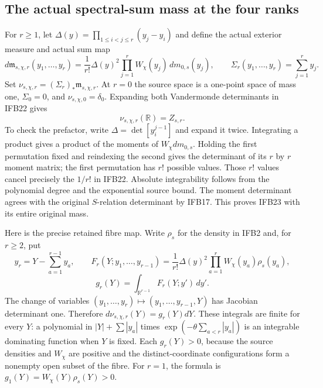 \documentclass[11pt,a4paper]{article}
\begin{document}
\subsection{The actual spectral-sum mass at the four ranks}

For $r\geq1$, let $\Delta(y)=\prod_{1\leq i<j\leq r}(y_j-y_i)$
and define the actual exterior measure and actual sum map
\[
 d\mathfrak m_{s,\chi,r}(y_1,\ldots,y_r)
 =\frac1{r!}\Delta(y)^2\prod_{j=1}^r
       W_\chi(y_j)\,dm_{0,s}(y_j),\qquad
 \Sigma_r(y_1,\ldots,y_r)=\sum_{j=1}^ry_j.
 \tag{IFB22}
\]
Set $\nu_{s,\chi,r}=(\Sigma_r)_*\mathfrak m_{s,\chi,r}$.
At $r=0$ the source space is a one-point space of mass one,
$\Sigma_0=0$, and $\nu_{s,\chi,0}=\delta_0$.
Expanding both Vandermonde determinants in IFB22 gives
\[
 \nu_{s,\chi,r}(\mathbb R)=Z_{s,r}.
 \tag{IFB23}
\]
To check the prefactor, write $\Delta=\det[y_i^{j-1}]$ and
expand it twice. Integrating a product gives a product of the
moments of $W_\chi dm_{0,s}$. Holding the first permutation fixed
and reindexing the second gives the determinant of its $r$ by $r$
moment matrix; the first permutation has $r!$ possible values.
Those $r!$ values cancel precisely the $1/r!$ in IFB22. Absolute
integrability follows from the polynomial degree and the exponential
source bound. The moment determinant agrees with the original
$S$-relation determinant by IFB17. This proves IFB23 with its
entire original mass.

Here is the precise retained fibre map. Write $\rho_s$ for the
density in IFB2 and, for $r\geq2$, put
\[
 y_r=Y-\sum_{a=1}^{r-1}y_a,\qquad
 F_r(Y;y_1,\ldots,y_{r-1})
 =\frac1{r!}\Delta(y)^2\prod_{a=1}^r W_\chi(y_a)\rho_s(y_a),
\]
\[
 g_r(Y)=\int_{\mathbb R^{r-1}}F_r(Y;y')\,dy'.
 \tag{IFB24}
\]
The change of variables $(y_1,\ldots,y_r)\mapsto(y_1,\ldots,
y_{r-1},Y)$ has Jacobian determinant one. Therefore
$d\nu_{s,\chi,r}(Y)=g_r(Y)dY$. These integrals are finite for every
$Y$: a polynomial in $|Y|+\sum|y_a|$ times
$\exp(-\theta\sum_{a<r}|y_a|)$ is an integrable dominating
function when $Y$ is fixed. Each $g_r(Y)>0$, because the source
densities and $W_\chi$ are positive and the distinct-coordinate
configurations form a nonempty open subset of the fibre.
For $r=1$, the formula is $g_1(Y)=W_\chi(Y)\rho_s(Y)>0$.
\end{document}
